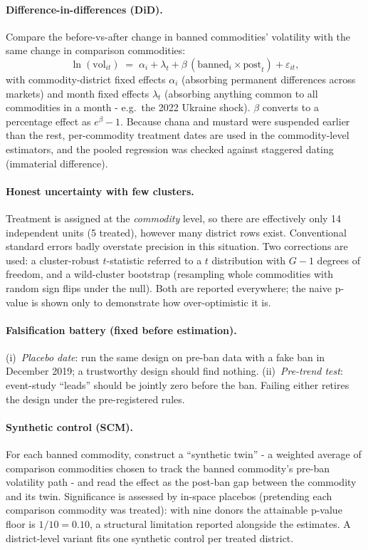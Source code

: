 \documentclass[11pt]{article}
\begin{document}
\paragraph{Difference-in-differences (DiD).} Compare the before-vs-after change in banned
commodities' volatility with the same change in comparison commodities:
\[
\ln(\mathrm{vol}_{it}) \;=\; \alpha_i + \lambda_t + \beta\,(\mathrm{banned}_i \times
\mathrm{post}_t) + \varepsilon_{it},
\]
with commodity-district fixed effects $\alpha_i$ (absorbing permanent differences across
markets) and month fixed effects $\lambda_t$ (absorbing anything common to all
commodities in a month - e.g.\ the 2022 Ukraine shock). $\beta$ converts to a percentage
effect as $e^{\beta}-1$. Because chana and mustard were suspended earlier than the rest,
per-commodity treatment dates are used in the commodity-level estimators, and the pooled
regression was checked against staggered dating (immaterial difference).

\paragraph{Honest uncertainty with few clusters.} Treatment is assigned at the
\emph{commodity} level, so there are effectively only 14 independent units (5 treated),
however many district rows exist. Conventional standard errors badly overstate precision
in this situation. Two corrections are used: a cluster-robust $t$-statistic referred to a
$t$ distribution with $G-1$ degrees of freedom, and a wild-cluster bootstrap (resampling
whole commodities with random sign flips under the null). Both are reported everywhere;
the naive p-value is shown only to demonstrate how over-optimistic it is.

\paragraph{Falsification battery (fixed before estimation).} (i)~\emph{Placebo date}: run
the same design on pre-ban data with a fake ban in December 2019; a trustworthy design
should find nothing. (ii)~\emph{Pre-trend test}: event-study ``leads'' should be jointly
zero before the ban. Failing either retires the design under the pre-registered rules.

\paragraph{Synthetic control (SCM).} For each banned commodity, construct a ``synthetic
twin'' - a weighted average of comparison commodities chosen to track the banned
commodity's pre-ban volatility path - and read the effect as the post-ban gap between
the commodity and its twin. Significance is assessed by in-space placebos (pretending
each comparison commodity was treated): with nine donors the attainable p-value floor is
$1/10 = 0.10$, a structural limitation reported alongside the estimates. A district-level
variant fits one synthetic control per treated district.
\end{document}
